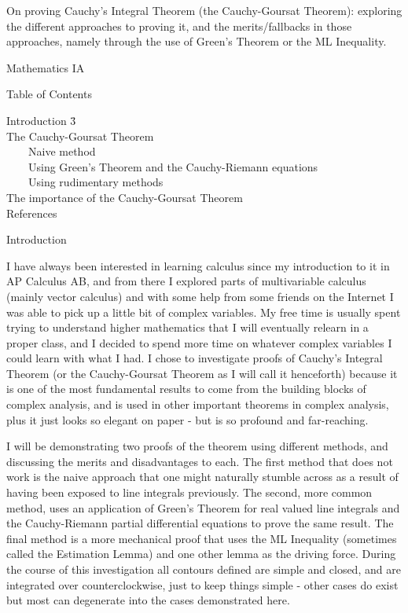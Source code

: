 \documentclass[11pt]{article}
\begin{document}
\begin{center}

On proving Cauchy's Integral Theorem (the Cauchy-Goursat Theorem): exploring the different approaches to proving it, and the merits/fallbacks in those approaches, namely through the use of Green's Theorem or the ML Inequality.

Mathematics IA

\end{center}
\vfill
\pagebreak

{\centering{}Table of Contents

}
\begin{tabbing}
Introduction \hspace{13.98cm} \= 3\\
The Cauchy-Goursat Theorem \\
~~~~Naive method \\
~~~~Using Green's Theorem and the Cauchy-Riemann equations \\
~~~~Using rudimentary methods \\
The importance of the Cauchy-Goursat Theorem \\
References \\
\end{tabbing}
\pagebreak

{\centering{}Introduction

}

I have always been interested in learning calculus since my introduction to it in AP Calculus AB, and from there I explored parts of multivariable calculus (mainly vector calculus) and with some help from some friends on the Internet I was able to pick up a little bit of complex variables. My free time is usually spent trying to understand higher mathematics that I will eventually relearn in a proper class, and I decided to spend more time on whatever complex variables I could learn with what I had. I chose to investigate proofs of Cauchy's Integral Theorem (or the Cauchy-Goursat Theorem as I will call it henceforth) because it is one of the most fundamental results to come from the building blocks of complex analysis, and is used in other important theorems in complex analysis, plus it just looks so elegant on paper - but is so profound and far-reaching.

I will be demonstrating two proofs of the theorem using different methods, and discussing the merits and disadvantages to each. The first method that does not work is the naive approach that one might naturally stumble across as a result of having been exposed to line integrals previously. The second, more common method, uses an application of Green's Theorem for real valued line integrals and the Cauchy-Riemann partial differential equations to prove the same result. The final method is a more mechanical proof that uses the ML Inequality (sometimes called the Estimation Lemma) and one other lemma as the driving force. During the course of this investigation all contours defined are simple and closed, and are integrated over counterclockwise, just to keep things simple - other cases do exist but most can degenerate into the cases demonstrated here.
\end{document}
